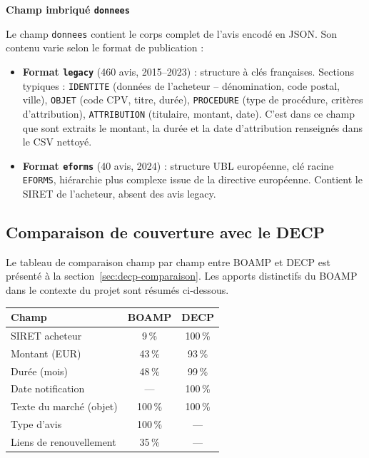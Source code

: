 \documentclass[12pt,a4paper]{article}
\begin{document}
\medskip
\textbf{Champ imbriqué \texttt{donnees}}

Le champ \texttt{donnees} contient le corps complet de l'avis encodé en JSON.
Son contenu varie selon le format de publication :

\begin{itemize}
  \item[---] \textbf{Format \texttt{legacy}} (460 avis, 2015--2023) : structure
    à clés françaises. Sections typiques : \texttt{IDENTITE} (données de
    l'acheteur -- dénomination, code postal, ville), \texttt{OBJET} (code CPV,
    titre, durée), \texttt{PROCEDURE} (type de procédure, critères
    d'attribution), \texttt{ATTRIBUTION} (titulaire, montant, date). C'est
    dans ce champ que sont extraits le montant, la durée et la date
    d'attribution renseignés dans le CSV nettoyé.
  \item[---] \textbf{Format \texttt{eforms}} (40 avis, 2024) : structure UBL
    européenne, clé racine \texttt{EFORMS}, hiérarchie plus complexe issue de
    la directive européenne. Contient le SIRET de l'acheteur, absent des
    avis legacy.
\end{itemize}

\subsection{Comparaison de couverture avec le DECP}
\label{sec:boamp-comparaison}

Le tableau de comparaison champ par champ entre BOAMP et DECP est présenté à
la section~\ref{sec:decp-comparaison}. Les apports distinctifs du BOAMP dans
le contexte du projet sont résumés ci-dessous.

\begin{center}
\begin{tabular}{lcc}
\toprule
\textbf{Champ} & \textbf{BOAMP} & \textbf{DECP} \\
\midrule
SIRET acheteur          &  9\,\%   & 100\,\% \\
Montant (EUR)           & 43\,\%   &  93\,\% \\
Durée (mois)            & 48\,\%   &  99\,\% \\
Date notification       &  ---     & 100\,\% \\
Texte du marché (objet) & 100\,\% & 100\,\% \\
Type d'avis             & 100\,\% &  ---    \\
Liens de renouvellement & 35\,\%  &  ---    \\
\bottomrule
\end{tabular}
\end{center}
\end{document}
